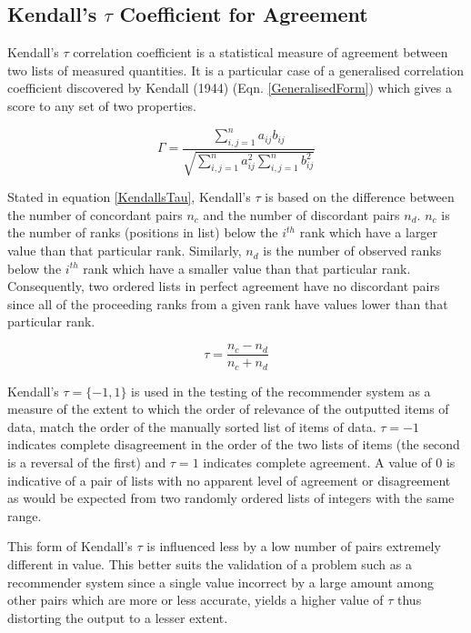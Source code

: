 \subsection{Kendall's $\tau$ Coefficient for Agreement}

Kendall's $\tau$ correlation coefficient is a statistical measure of agreement between two lists of measured quantities. It is a particular case of a generalised correlation coefficient discovered by Kendall (1944) (Eqn. \ref{GeneralisedForm}) which gives a score to any set of two properties. 

\begin{equation}\label{GeneralisedForm}	
	\Gamma  = \frac{\sum_{i,j=1}^{n}a_{ij}b_{ij}}{\sqrt{\sum_{i,j=1}^{n}a_{ij}^2\sum_{i,j=1}^{n}b_{ij}^2}} 
\end{equation}

Stated in equation \ref{KendallsTau}, Kendall's $\tau$ is based on the difference between the number of concordant pairs $n_c$ and the number of discordant pairs $n_d$. $n_c$ is the number of ranks (positions in list) below the $i^{th}$ rank which have a larger value than that particular rank. Similarly, $n_d$ is the number of observed ranks below the $i^{th}$ rank which have a smaller value than that particular rank. Consequently, two ordered lists in perfect agreement have no discordant pairs since all of the proceeding ranks from a given rank have values lower than that particular rank. 

\begin{equation}\label{KendallsTau}	
	\tau  = \frac{n_c - n_d}{n_c+n_d} 
\end{equation}

Kendall's $\tau = \{-1, 1\}$ is used in the testing of the recommender system as a measure of the extent to which the order of relevance of the outputted items of data, match the order of the manually sorted list of items of data. $\tau = -1$ indicates complete disagreement in the order of the two lists of items (the second is a reversal of the first) and $\tau = 1$ indicates complete agreement. A value of $0$ is indicative of a pair of lists with no apparent level of agreement or disagreement as would be expected from two randomly ordered lists of integers with the same range.  

This form of Kendall's $\tau$ is influenced less by a low number of pairs extremely different in value. This better suits the validation of a problem such as a recommender system since a single value incorrect by a large amount among other pairs which are more or less accurate, yields a higher value of $\tau$ thus distorting the output to a lesser extent. 

